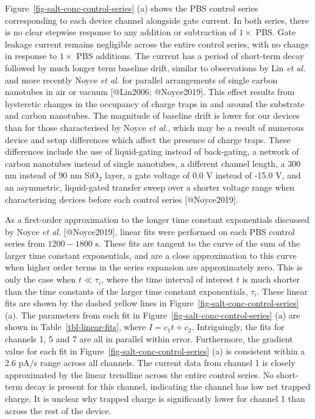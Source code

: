 \documentclass[
  letterpaper,
  DIV=11,
  numbers=noendperiod]{scrartcl}
\begin{document}
Figure~\ref{fig-salt-conc-control-series} (a) shows the PBS control
series corresponding to each device channel alongside gate current. In
both series, there is no clear stepwise response to any addition or
subtraction of \(1 \times\) PBS. Gate leakage current remains negligible
across the entire control series, with no change in response to
\(1 \times\) PBS additions. The current has a period of short-term decay
followed by much longer term baseline drift, similar to observations by
Lin \emph{et al.} and more recently Noyce \emph{et al.} for parallel
arrangements of single carbon nanotubes in air or vacuum {[}@Lin2006;
@Noyce2019{]}. This effect results from hysteretic changes in the
occupancy of charge traps in and around the substrate and carbon
nanotubes. The magnitude of baseline drift is lower for our devices than
for those characterised by Noyce \emph{et al.}, which may be a result of
numerous device and setup differences which affect the presence of
charge traps. These differences include the use of liquid-gating instead
of back-gating, a network of carbon nanotubes instead of single
nanotubes, a different channel length, a 300 nm instead of 90 nm
SiO\(_2\) layer, a gate voltage of 0.0 V instead of -15.0 V, and an
asymmetric, liquid-gated transfer sweep over a shorter voltage range
when characterising devices before each control series {[}@Noyce2019{]}.

As a first-order approximation to the longer time constant exponentials
discussed by Noyce \emph{et al.} {[}@Noyce2019{]}, linear fits were
performed on each PBS control series from \(1200-1800\) s. These fits
are tangent to the curve of the sum of the larger time constant
exponentials, and are a close approximation to this curve when higher
order terms in the series expansion are approximately zero. This is only
the case when \(t\ll\tau_i\), where the time interval of interest \(t\)
is much shorter than the time constants of the larger time constant
exponentials, \(\tau_i\). These linear fits are shown by the dashed
yellow lines in Figure~\ref{fig-salt-conc-control-series} (a). The
parameters from each fit in Figure~\ref{fig-salt-conc-control-series}
(a) are shown in Table~\ref{tbl-linear-fits}, where \(I = c_1t + c_2\).
Intriguingly, the fits for channels 1, 5 and 7 are all in parallel
within error. Furthermore, the gradient value for each fit in
Figure~\ref{fig-salt-conc-control-series} (a) is consistent within a 2.6
pA/s range across all channels. The current data from channel 1 is
closely approximated by the linear trendline across the entire control
series. No short-term decay is present for this channel, indicating the
channel has low net trapped charge. It is unclear why trapped charge is
significantly lower for channel 1 than across the rest of the device.
\end{document}
